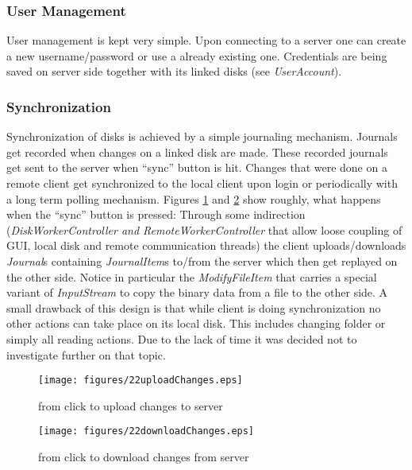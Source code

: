 \subsubsection{User Management}
User management is kept very simple. Upon connecting to a server one can
create a new username/password or use a already existing one. Credentials are
being saved on server side together with its linked disks (see
\textit{UserAccount}).

\subsubsection{Synchronization}
Synchronization of disks is achieved by a simple journaling mechanism. Journals
get recorded when changes on a linked disk are made. These recorded journals get
sent to the server when ``sync'' button is hit. Changes that were done on a
remote client get synchronized to the local client upon login or periodically
with a long term polling mechanism. Figures \ref{fig:22uploadChanges} and
\ref{fig:22downloadChanges} show roughly, what happens when the ``sync'' button
is pressed: Through some indirection (\textit{DiskWorkerController and
RemoteWorkerController} that allow loose coupling of GUI, local disk and remote
communication threads) the client uploads/downloads \textit{Journal}s containing
\textit{JournalItem}s to/from the server which then get replayed on the other
side. Notice in particular the \textit{ModifyFileItem} that carries a special
variant of \textit{InputStream} to copy the binary data from a file to the other
side. A small drawback of this design is that while client is doing
synchronization no other actions can take place on its local disk. This includes
changing folder or simply all reading actions. Due to the lack of time it was
decided not to investigate further on that topic.

\begin{figure}[h!]
\centering
\texttt{[image: figures/22uploadChanges.eps]}
\caption{from click to upload changes to server}
\label{fig:22uploadChanges}
\end{figure}

\begin{figure}[h!]
\centering
\texttt{[image: figures/22downloadChanges.eps]}
\caption{from click to download changes from server}
\label{fig:22downloadChanges}
\end{figure}


